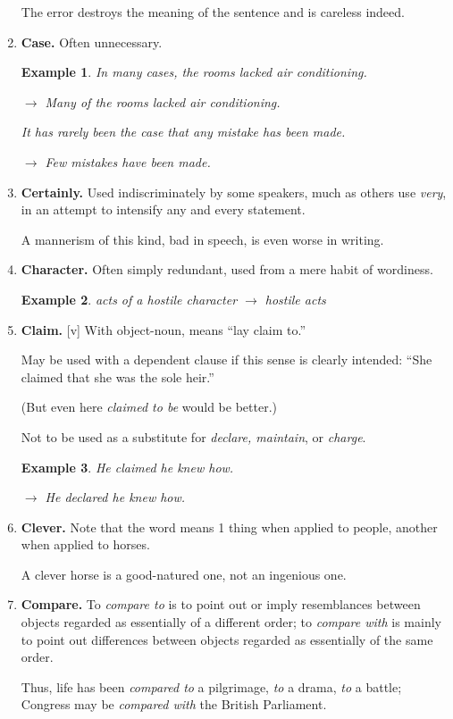 \documentclass{article}
\newtheorem{example}{Example}
\begin{document}
\begin{enumerate}
	The error destroys the meaning of the sentence and is careless indeed.
	\item {\bf Case.} Often unnecessary.
	\begin{example}
		In many cases, the rooms lacked air conditioning.
		
		$\to$ Many of the rooms lacked air conditioning.
		
		It has rarely been the case that any mistake has been made.
		
		$\to$ Few mistakes have been made.
	\end{example}
	\item {\bf Certainly.} Used indiscriminately by some speakers, much as others use {\it very}, in an attempt to intensify any and every statement.
	
	A mannerism of this kind, bad in speech, is even worse in writing.
	\item {\bf Character.} Often simply redundant, used from a mere habit of wordiness.
	\begin{example}
		acts of a hostile character $\to$ hostile acts
	\end{example}
	\item {\bf Claim.} [v] With object-noun, means ``lay claim to.''
	
	May be used with a dependent clause if this sense is clearly intended: ``She claimed that she was the sole heir.''
	
	(But even here {\it claimed to be} would be better.)
	
	Not to be used as a substitute for {\it declare, maintain}, or {\it charge}.
	\begin{example}
		He claimed he knew how.
		
		$\to$ He declared he knew how.
	\end{example}
	\item {\bf Clever.} Note that the word means 1 thing when applied to people, another when applied to horses.
	
	A clever horse is a good-natured one, not an ingenious one.
	\item {\bf Compare.} To {\it compare to} is to point out or imply resemblances between objects regarded as essentially of a different order; to {\it compare with} is mainly to point out differences between objects regarded as essentially of the same order.
	
	Thus, life has been {\it compared to} a pilgrimage, {\it to} a drama, {\it to} a battle; Congress may be {\it compared with} the British Parliament.
	

\end{enumerate}
\end{document}
